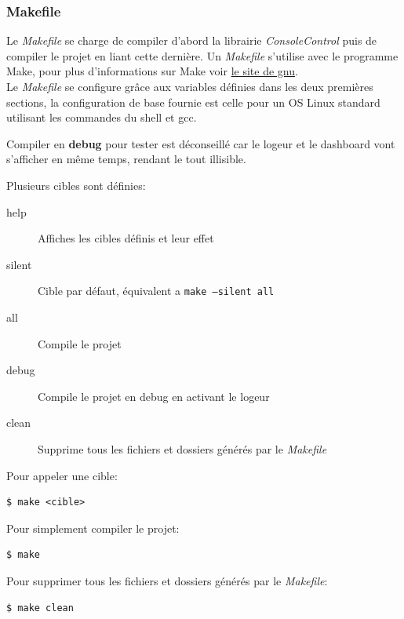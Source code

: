 \documentclass[article, backcover, french, nodocumentinfo]{upmethodology-document}
\begin{document}
			\subsubsection{Makefile}
				Le \textit{Makefile} se charge de compiler d'abord la librairie \textit{ConsoleControl} puis de compiler le projet en liant cette dernière. Un \textit{Makefile} s'utilise avec le programme Make, pour plus d'informations sur Make voir \href{https://www.gnu.org/software/make/}{le site de gnu}.\\
				Le \textit{Makefile} se configure grâce aux variables définies dans les deux premières sections, la configuration de base fournie est celle pour un OS Linux standard utilisant les commandes du shell et gcc.
				\begin{upmcaution}
					Compiler en \textbf{debug} pour tester est déconseillé car le logeur et le dashboard vont s'afficher en même temps, rendant le tout illisible.
				\end{upmcaution}
					Plusieurs cibles sont définies:
					\begin{description}
						\item[help] Affiches les cibles définis et leur effet
						\item[silent] Cible par défaut, équivalent a \texttt{make --silent all}
						\item[all] Compile le projet
						\item[debug] Compile le projet en debug en activant le logeur
						\item[clean] Supprime tous les fichiers et dossiers générés par le \textit{Makefile}
					\end{description}
					Pour appeler une cible:
					\begin{lstlisting}[breaklines=true,breakatwhitespace=true,breakindent=0pt,columns=fixed,keepspaces=true,frame=single,basicstyle=\footnotesize\sffamily]
$ make <cible>\end{lstlisting}
					Pour simplement compiler le projet:
					\begin{lstlisting}[breaklines=true,breakatwhitespace=true,breakindent=0pt,columns=fixed,keepspaces=true,frame=single,basicstyle=\footnotesize\sffamily]
$ make\end{lstlisting}
					Pour supprimer tous les fichiers et dossiers générés par le \textit{Makefile}:
					\begin{lstlisting}[breaklines=true,breakatwhitespace=true,breakindent=0pt,columns=fixed,keepspaces=true,frame=single,basicstyle=\footnotesize\sffamily]
$ make clean\end{lstlisting}
\end{document}
